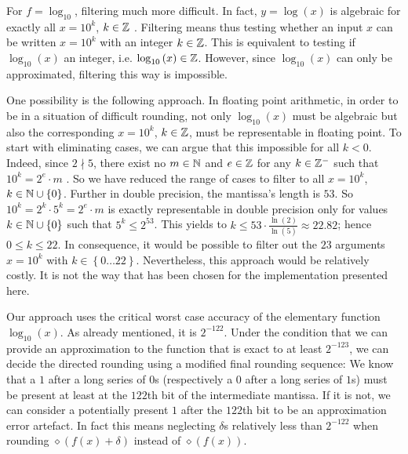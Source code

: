 For $f = \log_{10}$, filtering much more difficult. In fact, $y =
\log\left( x \right)$ is algebraic for exactly all $x = 10^k$, $k \in
\mathbb {Z}$ \cite{Baker75}. Filtering means thus testing whether an input $x$
can be written $x = 10^k$ with an integer $k \in \mathbb {Z}$. This is
equivalent to testing if $\log_{10}\left( x \right)$ an integer,
i.e. $\log_{10}\left( x \right) \in \mathbb {Z}$. However, since $\log_{10}\left( x
\right)$ can only be approximated, filtering this way is
impossible.

One possibility is the following approach. In
floating point arithmetic, in order to be in a situation of difficult
rounding, not only $\log_{10}\left( x \right)$ must be algebraic but
also the corresponding $x = 10^k$, $k \in \mathbb {Z}$, must be representable
in floating point. To start with eliminating cases, we can argue that
this impossible for all $k < 0$. Indeed, since $2 \nmid 5$, there
exist no $m \in \mathbb {N}$ and $e \in \mathbb {Z}$ for any $k \in \mathbb {Z}^-$ such that
$10^k = 2^e \cdot m$ \cite{Muller97}. So we have reduced the range of
cases to filter to all $x = 10^k$, $k \in \mathbb {N} \cup \left \lbrace
0\right \rbrace$. Further in double precision, the mantissa's length
is $53$. So $10^k = 2^k \cdot 5^k = 2^e \cdot m$ is exactly
representable in double precision only for values $k \in \mathbb {N} \cup \left
\lbrace 0 \right \rbrace$ such that $5^k \leq 2^{53}$. This yields to
$k \leq 53 \cdot \frac{\ln\left( 2 \right)}{\ln\left( 5 \right)}
\approx 22.82$; hence $0 \leq k \leq 22$. In consequence, it would be
possible to filter out the $23$ arguments $x = 10^k$ with $k \in \left
\lbrace 0 \dots 22 \right \rbrace$. Nevertheless, this approach would
be relatively costly. It is not the way that has been chosen for the
implementation presented here.

Our approach uses the critical worst case accuracy of the
elementary function $\log_{10}\left( x \right)$. As already mentioned,
it is $2^{-122}$. Under the condition that we can provide an
approximation to the function that is exact to at least $2^{-123}$, we
can decide the directed rounding using a modified final rounding
sequence: We know that a $1$ after a long series of $0$s (respectively
a $0$ after a long series of $1$s) must be present at least at the
$122$th bit of the intermediate mantissa.  If it is not, we can
consider a potentially present $1$ after the $122$th bit to be an
approximation error artefact. In fact this means neglecting $\delta$s
relatively less than $2^{-122}$ when rounding $\diamond \left( f\left(
x \right) + \delta \right)$ instead of $\diamond \left( f\left( x
\right) \right)$.

